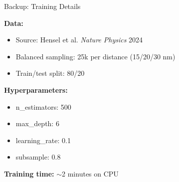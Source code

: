\documentclass[aspectratio=169]{beamer}
\begin{document}
\begin{frame}{Backup: Training Details}
    
    \textbf{Data:}
    \begin{itemize}
        \item Source: Hensel et al. \textit{Nature Physics} 2024
        \item Balanced sampling: 25k per distance (15/20/30 nm)
        \item Train/test split: 80/20
    \end{itemize}
    
    \vspace{0.5cm}
    
    \textbf{Hyperparameters:}
    \begin{itemize}
        \item n\_estimators: 500
        \item max\_depth: 6
        \item learning\_rate: 0.1
        \item subsample: 0.8
    \end{itemize}
    
    \vspace{0.3cm}
    
    \textbf{Training time:} $\sim$2 minutes on CPU
    
\end{frame}
\end{document}
